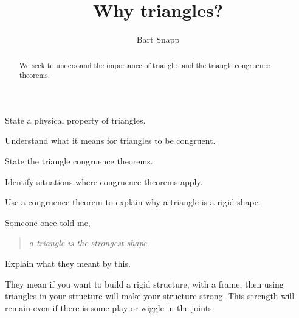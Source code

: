 \documentclass[noauthor,nooutcomes]{ximera}
\title{Why triangles?}
\author{Bart Snapp}
\begin{document}
\begin{abstract}
  We seek to understand the importance of triangles and the triangle
  congruence theorems.
\end{abstract}
\maketitle


\begin{listOutcomes}
\item{State a physical property of triangles.}
\item{Understand what it means for triangles to be congruent.}
\item{State the triangle congruence theorems.}
\item{Identify situations where congruence theorems apply.}
\item{Use a congruence theorem to explain why a triangle is a rigid shape.}
\end{listOutcomes}

\mynewpage


\begin{question}
  Someone once told me,
  \begin{quote}
    \textit{a triangle is the strongest shape.}
  \end{quote}
  Explain what they meant by this.
  \begin{freeResponse}
    They mean if you want to build a rigid structure, with a frame,
    then using triangles in your structure will make your structure
    strong. This strength will remain even if there is some play
    or wiggle in the joints.
  \end{freeResponse}
\end{question}
\mynewpage
\end{document}

